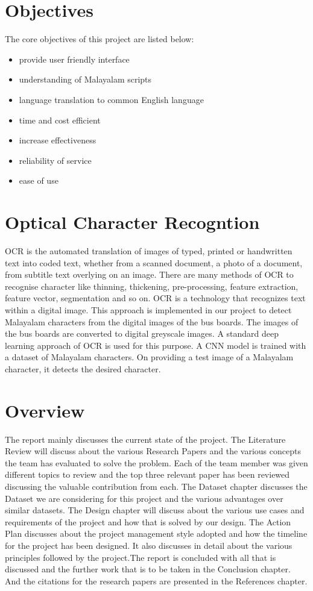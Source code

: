 \documentclass[a4paper,12pt]{report}
\begin{document}
\section{Objectives}
The core objectives of this project are listed below:
\begin{itemize}
\item provide user friendly interface
\item understanding of Malayalam scripts
\item language translation to common English language
\item time and cost efficient
\item increase effectiveness
\item reliability of service
\item ease of use
\end{itemize}

\section{Optical Character Recogntion}
OCR is the automated translation of images of typed, printed or handwritten text into coded text, whether from a scanned document, a photo of a document,  from subtitle  text  overlying  on  an  image. There  are  many  methods  of  OCR  to recognise character like thinning, thickening, pre-processing, feature extraction, 
feature vector, segmentation and so on. 
OCR is a technology that recognizes text within a digital image. This approach is implemented in our project to detect Malayalam characters from the digital images of the bus boards. The images of the bus boards are converted to digital greyscale images. A standard deep learning approach of OCR is used for this purpose. A CNN model is trained with a dataset of Malayalam characters. On providing a test image of a Malayalam character, it detects the desired character. 

\section{Overview}
The report mainly discusses the current state of the project. The Literature Review will discuss about the various Research Papers and the various concepts the team has evaluated to solve the problem. Each of the team member was given different topics to review and the top three relevant paper has been reviewed discussing the valuable contribution from each. The Dataset chapter discusses the Dataset we are considering for this project and the various advantages over similar datasets. The Design chapter will discuss about the various use cases and requirements of the project and how that is solved by our design. The Action Plan discusses about the project management style adopted and how the timeline for the project has been designed. It also discusses in detail about the various principles followed by the project.The report is concluded with all that is discussed and the further work that is to be taken in the Conclusion chapter. And the citations for the research papers are presented in the References chapter.
\end{document}

